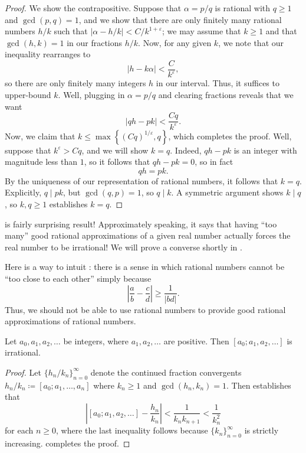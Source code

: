 \documentclass[../notes.tex]{subfiles}
\begin{document}
\begin{proof}
	We show the contrapositive. Suppose that $\alpha=p/q$ is rational with $q\ge1$ and $\gcd(p,q)=1$, and we show that there are only finitely many rational numbers $h/k$ such that $\left|\alpha-h/k\right|<C/k^{1+\varepsilon}$; we may assume that $k\ge1$ and that $\gcd(h,k)=1$ in our fractions $h/k$. Now, for any given $k$, we note that our inequality rearranges to
	\[\left|h-k\alpha\right|<\frac C{k^\varepsilon},\]
	so there are only finitely many integers $h$ in our interval. Thus, it suffices to upper-bound $k$. Well, plugging in $\alpha=p/q$ and clearing fractions reveals that we want
	\[\left|qh-pk\right|<\frac{Cq}{k^\varepsilon}.\]
	Now, we claim that $k\le\max\left\{(Cq)^{1/\varepsilon},q\right\}$, which completes the proof. Well, suppose that $k^\varepsilon>Cq$, and we will show $k=q$. Indeed, $qh-pk$ is an integer with magnitude less than $1$, so it follows that $qh-pk=0$, so in fact
	\[qh=pk.\]
	By the uniqueness of our representation of rational numbers, it follows that $k=q$. Explicitly, $q\mid pk$, but $\gcd(q,p)=1$, so $q\mid k$. A symmetric argument shows $k\mid q$, so $k,q\ge1$ establishes $k=q$.
\end{proof}
\begin{remark}
	 is fairly surprising result! Approximately speaking, it says that having ``too many'' good rational approximations of a given real number actually forces the real number to be irrational! We will prove a converse shortly in .
\end{remark}
\begin{remark}
	Here is a way to intuit : there is a sense in which rational numbers cannot be ``too close to each other'' simply because
	\[\left|\frac ab-\frac cd\right|\ge\frac1{\left|bd\right|}.\]
	Thus, we should not be able to use rational numbers to provide good rational approximations of rational numbers.
\end{remark}
\begin{corollary} \label{cor:inf-cf-is-irrat}
	Let $a_0,a_1,a_2,\ldots$ be integers, where $a_1,a_2,\ldots$ are positive. Then $[a_0;a_1,a_2,\ldots]$ is irrational.
\end{corollary}
\begin{proof}
	Let $\{h_n/k_n\}_{n=0}^\infty$ denote the continued fraction convergents $h_n/k_n\coloneqq[a_0;a_1,\ldots,a_n]$ where $k_n\ge1$ and $\gcd(h_n,k_n)=1$. Then  establishes that
	\[\left|[a_0;a_1,a_2,\ldots]-\frac{h_n}{k_n}\right|<\frac1{k_nk_{n+1}}<\frac1{k_n^2}\]
	for each $n\ge0$, where the last inequality follows because $\{k_n\}_{n=0}^\infty$ is strictly increasing.  completes the proof.
\end{proof}
\end{document}
